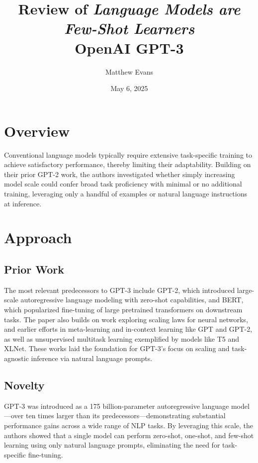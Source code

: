 \documentclass[10pt]{article}
\title{
    Review of \textit{Language Models are Few-Shot Learners}\\
    \small{OpenAI GPT-3}
}
\author{Matthew Evans}
\date{May 6, 2025}
\begin{document}
\maketitle

\section*{Overview}
Conventional language models typically require extensive task-specific training to achieve satisfactory performance, thereby limiting their adaptability. Building on their prior GPT-2\cite{radford2019language} work, the authors\cite{NEURIPS2020_1457c0d6} investigated whether simply increasing model scale could confer broad task proficiency with minimal or no additional training, leveraging only a handful of examples or natural language instructions at inference.

\section*{Approach}
\subsection*{Prior Work}
The most relevant predecessors to GPT-3 include GPT-2, which introduced large-scale autoregressive language modeling with zero-shot capabilities, and BERT\cite{DBLP:journals/corr/abs-1810-04805}, which popularized fine-tuning of large pretrained transformers on downstream tasks. The paper also builds on work exploring scaling laws for neural networks\cite{DBLP:journals/corr/abs-2001-08361}, and earlier efforts in meta-learning and in-context learning like GPT and GPT-2, as well as unsupervised multitask learning exemplified by models like T5\cite{DBLP:journals/corr/abs-1910-10683} and XLNet\cite{DBLP:journals/corr/abs-1906-08237}. These works laid the foundation for GPT-3's focus on scaling and task-agnostic inference via natural language prompts.

\subsection*{Novelty}
GPT-3 was introduced as a 175 billion-parameter autoregressive language model—over ten times larger than its predecessors—demonstrating substantial performance gains across a wide range of NLP tasks. By leveraging this scale, the authors showed that a single model can perform zero-shot, one-shot, and few-shot learning using only natural language prompts, eliminating the need for task-specific fine-tuning.
\end{document}
